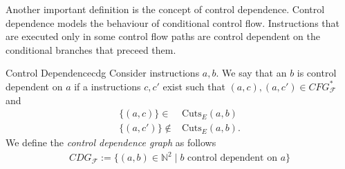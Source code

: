     Another important definition is the concept of control dependence.
    Control dependence models the behaviour of conditional control flow.
    Instructions that are executed only in some control flow paths are control
    dependent on the conditional branches that preceed them.

    \begin{definition}{Control Dependence}{cdg}
        Consider instructions $a,b$.
        We say that an $b$ is control dependent on $a$ if a instructions
        $c,c'$ exist such that $(a,c),(a,c')\in CFG_\mathcal{F}^*$ and
        \begin{align*}
            \{(a,c)\}\in{}&{}\text{Cuts}_E(a,b)\\
            \{(a,c')\}\notin{}&{}\text{Cuts}_E(a,b)\text{.}
        \end{align*}
        We define the {\em control dependence graph} as follows
        \begin{align*}
            CDG_\mathcal{F}:=\{(a,b)\in\mathbb{N}^2\mid b\text{ control dependent on }a\}
        \end{align*}
    \end{definition}

